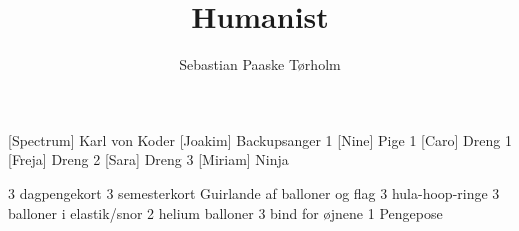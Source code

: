 \documentclass[a4paper,11pt]{article}
\title{Humanist}
\author{Sebastian Paaske Tørholm}
\begin{document}
\maketitle

  \begin{roles}
    [Spectrum] Karl von Koder
    [Joakim] Backupsanger 1
    [Nine] Pige 1
    [Caro] Dreng 1
    [Freja] Dreng 2
    [Sara] Dreng 3
    [Miriam] Ninja
  \end{roles}



\begin{props}

  \prop
{3 dagpengekort}
  \prop
{3 semesterkort}
  \prop
{Guirlande af balloner og flag}
  \prop
{3 hula-hoop-ringe}
  \prop
{3 balloner i elastik/snor}
  \prop
{2 helium balloner}
  \prop
{3 bind for øjnene}
  \prop
{1 Pengepose}
  \end{props}
\end{document}

